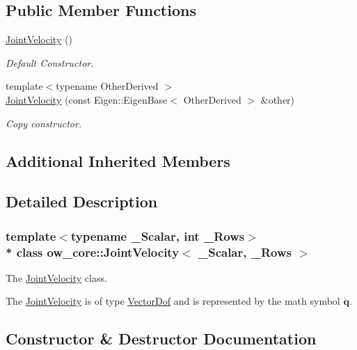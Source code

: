 \subsection*{Public Member Functions}
\begin{DoxyCompactItemize}
\item 
\hyperlink{classow__core_1_1JointVelocity_a4441b48524439cbd670908be707c3ed8}{Joint\+Velocity} ()\hypertarget{classow__core_1_1JointVelocity_a4441b48524439cbd670908be707c3ed8}{}\label{classow__core_1_1JointVelocity_a4441b48524439cbd670908be707c3ed8}

\begin{DoxyCompactList}\small\item\em Default Constructor. \end{DoxyCompactList}\item 
{\footnotesize template$<$typename Other\+Derived $>$ }\\\hyperlink{classow__core_1_1JointVelocity_ae94c411048769beee3a1623a4cb3ee91}{Joint\+Velocity} (const Eigen\+::\+Eigen\+Base$<$ Other\+Derived $>$ \&other)
\begin{DoxyCompactList}\small\item\em Copy constructor. \end{DoxyCompactList}\end{DoxyCompactItemize}
\subsection*{Additional Inherited Members}


\subsection{Detailed Description}
\subsubsection*{template$<$typename \+\_\+\+Scalar, int \+\_\+\+Rows$>$\\*
class ow\+\_\+core\+::\+Joint\+Velocity$<$ \+\_\+\+Scalar, \+\_\+\+Rows $>$}

The \hyperlink{classow__core_1_1JointVelocity}{Joint\+Velocity} class. 

The \hyperlink{classow__core_1_1JointVelocity}{Joint\+Velocity} is of type \hyperlink{classow__core_1_1VectorDof}{Vector\+Dof} and is represented by the math symbol $\mathbf{\dot{q}}$. 

\subsection{Constructor \& Destructor Documentation}
